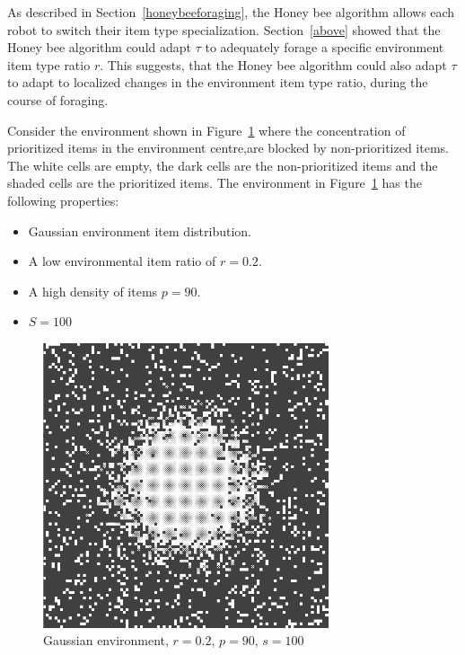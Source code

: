 As described in Section~\ref{honeybeeforaging}, the Honey bee algorithm allows each robot to switch their item type specialization. Section~\ref{above} showed that the Honey bee algorithm could adapt $\tau$ to adequately forage a specific environment item type ratio $r$. This suggests, that the Honey bee algorithm could also adapt $\tau$ to adapt to localized changes in the environment item type ratio, during the course of foraging. 

Consider the environment shown in Figure~\ref{fig:gaussianhighdensityenv} where the concentration of prioritized items in the environment centre,are blocked by non-prioritized items. The white cells are empty, the dark cells are the non-prioritized items and the shaded cells are the prioritized items. The environment in Figure~\ref{fig:gaussianhighdensityenv} has the following properties:

\begin{itemize}
\item Gaussian environment item distribution.
\item A low environmental item ratio of $r=0.2$.
\item A high density of items $p=90$.
\item $S=100$
\end{itemize}

\begin{figure}[!htb]
\centering
\includegraphics[width=0.75\textwidth]{chapters/chapter6/figures/flexibility-gaussian-obj90-ratio.PNG}
\caption{Gaussian environment, $r=0.2$, $p=90$, $s=100$}
\label{fig:gaussianhighdensityenv}
\end{figure}

